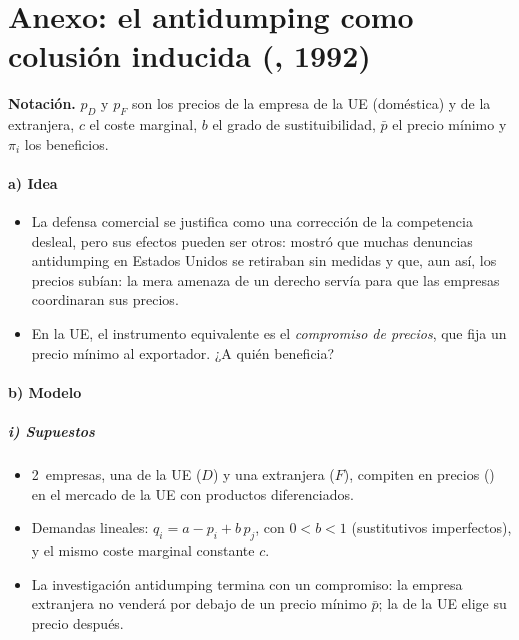 \documentclass[11pt]{article}
\begin{document}
\clearpage
\section{Anexo: el antidumping\cortetitulo{} como colusión inducida (, 1992)}\label{anexo:prusa}

\begin{anotaciones}
\textbf{Notación.} $p_D$ y $p_F$ son los precios de la empresa de la UE (doméstica) y de la extranjera, $c$ el coste marginal, $b$ el grado de sustituibilidad, $\bar p$ el precio mínimo y $\pi_i$ los beneficios.
\end{anotaciones}

\paragraph{a) Idea}

\begin{itemize}
\item La defensa comercial se justifica como una corrección de la competencia desleal, pero sus efectos pueden ser otros: \textcite{Prusa1992Withdrawn} mostró que muchas denuncias antidumping en Estados Unidos se retiraban sin medidas y que, aun así, los precios subían: la mera amenaza de un derecho servía para que las empresas coordinaran sus precios.
\item En la UE, el instrumento equivalente es el \emph{compromiso de precios}, que fija un precio mínimo al exportador. ¿A quién beneficia?
\end{itemize}

\paragraph{b) Modelo}

\subparagraph{i) Supuestos}

\begin{itemize}
\item 2~empresas, una de la UE ($D$) y una extranjera ($F$), compiten en precios () en el mercado de la UE con productos diferenciados.
\item Demandas lineales: $q_i=a-p_i+b\,p_j$, con $0<b<1$ (sustitutivos imperfectos), y el mismo coste marginal constante $c$.
\item La investigación antidumping termina con un compromiso: la empresa extranjera no venderá por debajo de un precio mínimo $\bar p$; la de la UE elige su precio después.
\end{itemize}
\end{document}
